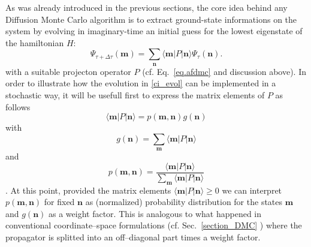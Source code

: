 As was already introduced in the previous sections, the core idea behind any Diffusion Monte Carlo algorithm is
to extract ground-state informations on the system by evolving in imaginary-time an initial guess for the lowest
eigenstate of the hamiltonian $H$: 
\begin{equation}
\label{ci_evol}
\Psi_{\tau + \Delta\tau} (\mathbf{m}) = \sum_{\mathbf{n}} \langle \mathbf{m} \lvert P \rvert \mathbf{n} \rangle \Psi_{\tau} (\mathbf{n}) .
\end{equation}
with a suitable projecton operator $P$ (cf. Eq.~\eqref{eq.afdmc} and discussion above). 
In order to illustrate how the evolution in \eqref{ci_evol} can be implemented in a stochastic way, it will be usefull 
first to express the matrix elements of $P$ as follows
\begin{equation}
\langle \mathbf{m} \lvert P \rvert \mathbf{n} \rangle = p(\mathbf{m},\mathbf{n}) g(\mathbf{n})
\end{equation}
with
\begin{equation}
\label{eq:CIMC_branching_factor}
g(\mathbf{n}) = \sum_{\mathbf{m}} \langle \mathbf{m} \lvert P \rvert \mathbf{n} \rangle 
\end{equation}
and
\begin{equation}
\label{eq:CIMC_prob}
p(\mathbf{m},\mathbf{n}) = \frac{\langle \mathbf{m} \lvert P \rvert \mathbf{n} \rangle}{\sum_{\mathbf{m}} \langle \mathbf{m} \lvert P \rvert \mathbf{n} \rangle }
\end{equation}.
At this point, provided the matrix elements $\langle \mathbf{m} \lvert P \rvert \mathbf{n} \rangle \geq 0$ we can interpret 
$p(\mathbf{m},\mathbf{n})$ for fixed $\mathbf{n}$ as (normalized) probability distribution for the states $\mathbf{m}$ and $g(\mathbf{n})$ as a weight factor. This is analogous to 
what happened in conventional coordinate--space formulations (cf. Sec.~\ref{section_DMC} ) where the propagator is splitted into
an off--diagonal part times a weight factor.


